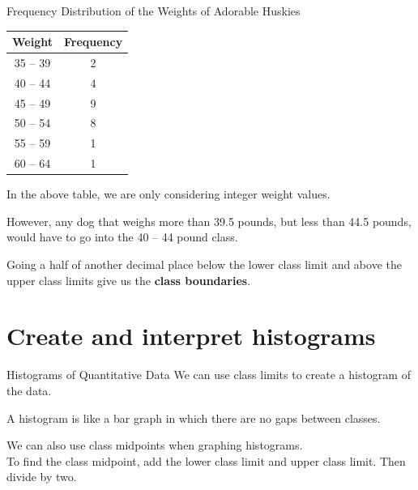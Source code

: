 \documentclass[t]{beamer}
\begin{document}
\begin{frame}{Frequency Distribution of the Weights of Adorable Huskies}
\begin{center}
\begin{tabular}{c|c}
\textbf{Weight} & \textbf{Frequency} \\ \hline
35 -- 39 & 2 \\
40 -- 44 & 4 \\
45 -- 49 & 9 \\
50 -- 54 & 8 \\
55 -- 59 & 1 \\
60 -- 64 & 1 \\
\end{tabular}
\end{center}
\pause
In the above table, we are only considering integer weight values.	\newline\\	\pause

However, any dog that weighs more than 39.5 pounds, but less than 44.5 pounds, would have to go into the 40 -- 44 pound class. \newline\\	\pause

Going a half of another decimal place below the lower class limit and above the upper class limits give us the {\color{blue}\textbf{class boundaries}}.
\end{frame}

\section{Create and interpret histograms}

\begin{frame}{Histograms of Quantitative Data}
We can use class limits to create a histogram of the data.	\newline\\	\pause

A histogram is like a bar graph in which there are no gaps between classes.		\pause

\begin{center}
\end{center}
\pause We can also use class midpoints when graphing histograms. \pause \newline\\

To find the class midpoint, add the lower class limit and upper class limit. Then divide by two.
\end{frame}
\end{document}
